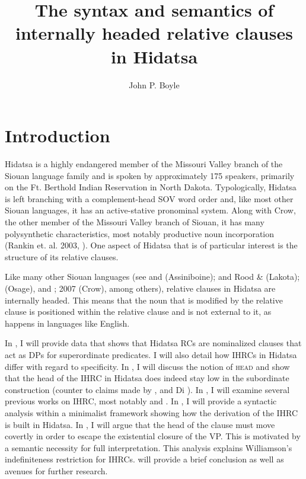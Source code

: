 \documentclass[output=paper]{LSP/langsci}
\author{John P. Boyle}
\title{The syntax and semantics of internally headed relative clauses in Hidatsa}
\begin{document}
\section{Introduction}  

Hidatsa is a highly endangered member of the Missouri Valley branch of the Siouan language family and is spoken by approximately 175 speakers, primarily on the Ft. Berthold Indian Reservation in North Dakota. Typologically, Hidatsa is left branching with a complement-head SOV word order and, like most other Siouan languages, it has an active-stative pronominal system. Along with Crow, the other member of the Missouri Valley branch of Siouan, it has many polysynthetic characteristics, most notably productive noun incorporation (Rankin et. al. 2003, \citealt{Boyle2007}). One aspect of Hidatsa that is of particular interest is the structure of its relative clauses.
	
Like many other Siouan languages (see \citealt{Drummond1976} and \citealt{Cumberland2005} (Assiniboine); \citealt{Williamson1987} and Rood \& \citealt{Taylor1996} (Lakota); \citealt{Quintero2004} (Osage), and \citealt{Graczyk1991}; 2007 (Crow), among others), relative clauses in Hidatsa are internally headed. This means that the noun that is modified by the relative clause is positioned within the relative clause and is not external to it, as happens in languages like English.
	
In , I will provide data that shows that Hidatsa RCs are nominalized clauses that act as DPs for superordinate predicates. I will also detail how IHRCs in Hidatsa differ with regard to specificity. In , I will discuss the notion of \textsc{head} and show that the head of the IHRC in Hidatsa does indeed stay low in the subordinate construction (counter to claims made by \citet{Kayne1994}, \citet{Bianchi1999} and Di \citet{Sciullo2005}). In , I will examine several previous works on IHRC, most notably \citet{Williamson1987} and \citet{Culy1990}. In , I will provide a syntactic analysis within a minimalist framework showing how the derivation of the IHRC is built in Hidatsa. In , I will argue that the head of the clause must move covertly in order to escape the existential closure of the VP. This is motivated by a semantic necessity for full interpretation. This analysis explains Williamson's indefiniteness restriction for IHRCs.  will provide a brief conclusion as well as avenues for further research.
\end{document}

